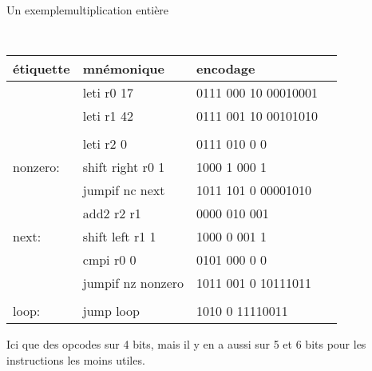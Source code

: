 \documentclass[slidetop,11pt,table]{beamer}
\begin{document}
\begin{frame}{Un exemple}{multiplication entière}
  \begin{center}
    \tt\small
    \begin{tabular}{llll}
      \textrm{étiquette} & \textrm{mnémonique} & \textrm{encodage}\\
      \hline
      
                         & leti	r0 17 & 0111 000 10 00010001 \\	
                         & leti	r1 42				 & 0111 001 10 00101010 \\
                         &									 &										 \\
                         & leti	r2 0				 & 0111 010 0 0				 \\
      nonzero: & shift	right r0 1 & 1000 1 000 1				 \\
                         & jumpif	nc next		 & 1011 101 0 00001010	 \\
                         & add2	r2 r1				 & 0000 010 001				 \\
      next:		 & shift	left r1 1	 & 1000 0 001 1				 \\
                         & cmpi	r0 0				 & 0101 000 0 0				 \\
                         & jumpif	nz nonzero & 1011 001 0 10111011	 \\
                         &									 &										 \\
      loop:		 & jump	loop				 & 1010 0 11110011			 \\
    \end{tabular}
  \end{center}
  Ici que des opcodes sur 4 bits, mais il y en a aussi sur 5 et 6 bits pour les instructions les moins utiles.
\end{frame}
\end{document}
